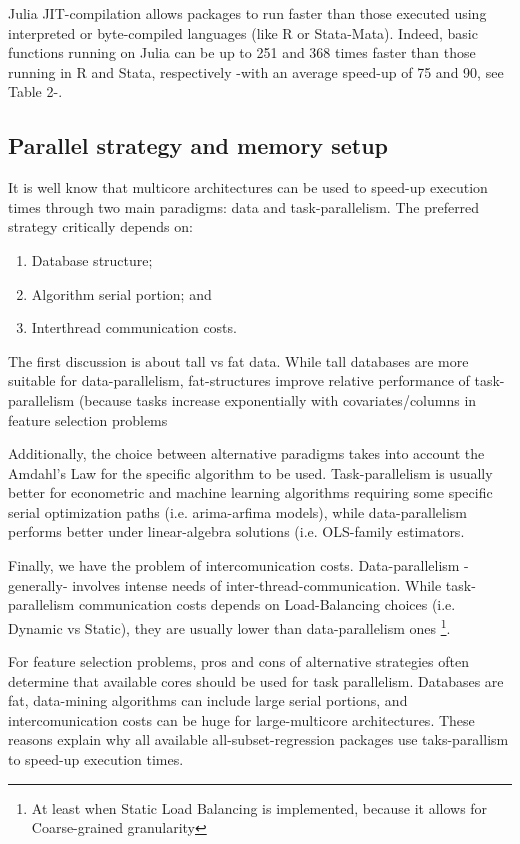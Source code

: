 \documentclass{juliacon}
\begin{document}
Julia JIT-compilation allows packages to run faster than those executed using interpreted or byte-compiled languages (like R or Stata-Mata). Indeed, basic functions running on Julia can be up to 251 and 368 times faster than those running in R and Stata, respectively -with an average speed-up of 75 and 90, see Table 2-.

\subsection{Parallel strategy and memory setup}
\label{subsub:parallelst}
It is well know that multicore architectures can be used to speed-up execution times through two main paradigms: data and task-parallelism. The preferred strategy critically depends on:
\begin{enumerate}
    \item Database structure;
    \item Algorithm serial portion; and
    \item Interthread communication costs.
\end{enumerate} 
The first discussion is about tall vs fat data. While tall databases are more suitable for data-parallelism, fat-structures improve relative performance of task-parallelism (because tasks increase exponentially with covariates/columns in feature selection problems \vskip 6pt

Additionally, the choice between alternative paradigms takes into account the Amdahl's Law for the specific algorithm to be used. Task-parallelism is usually better for econometric and machine learning algorithms requiring some specific serial optimization paths (i.e. arima-arfima models), while data-parallelism performs better under linear-algebra solutions (i.e. OLS-family estimators. \vskip 6pt

Finally, we have the problem of intercomunication costs. Data-parallelism -generally- involves intense needs of inter-thread-communication. While task-parallelism communication costs depends on Load-Balancing choices (i.e. Dynamic vs Static), they are usually lower than data-parallelism ones \footnote{At least when Static Load Balancing is implemented, because it allows for Coarse-grained granularity}. \vskip 6pt

For feature selection problems, pros and cons of alternative strategies often determine that available cores should be used for task parallelism. Databases are fat, data-mining algorithms can include large serial portions, and intercomunication costs can be huge for large-multicore architectures. These reasons explain why all available all-subset-regression packages use taks-parallism to speed-up execution times. \vskip 6pt
\end{document}
